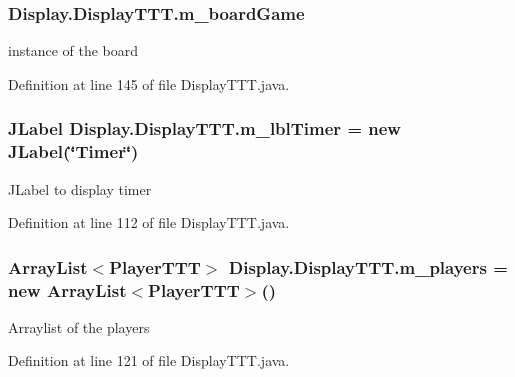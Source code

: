 \subsubsection[{m\+\_\+board\+Game}]{ Display.\+Display\+T\+T\+T.\+m\+\_\+board\+Game\hspace{0.3cm}{\ttfamily [private]}}\label{class_display_1_1_display_t_t_t_a3f540c3d30082e201fcb37c9623d6d27}
instance of the board 

Definition at line 145 of file Display\+T\+T\+T.\+java.

\hypertarget{class_display_1_1_display_t_t_t_a42c7a03ac93841369bd7e73460b59e11}{}
\subsubsection[{m\+\_\+lbl\+Timer}]{\setlength{\rightskip}{0pt plus 5cm}J\+Label Display.\+Display\+T\+T\+T.\+m\+\_\+lbl\+Timer = new J\+Label(\char`\"{}Timer\char`\"{})\hspace{0.3cm}{\ttfamily [private]}}\label{class_display_1_1_display_t_t_t_a42c7a03ac93841369bd7e73460b59e11}
J\+Label to display timer 

Definition at line 112 of file Display\+T\+T\+T.\+java.

\hypertarget{class_display_1_1_display_t_t_t_ad3a0687ab98eb4f191cd30a64ef60304}{}
\subsubsection[{m\+\_\+players}]{\setlength{\rightskip}{0pt plus 5cm}Array\+List$<${\bf Player\+T\+T\+T}$>$ Display.\+Display\+T\+T\+T.\+m\+\_\+players = new Array\+List$<${\bf Player\+T\+T\+T}$>$()\hspace{0.3cm}{\ttfamily [private]}}\label{class_display_1_1_display_t_t_t_ad3a0687ab98eb4f191cd30a64ef60304}
Arraylist of the players 

Definition at line 121 of file Display\+T\+T\+T.\+java.

\hypertarget{class_display_1_1_display_t_t_t_afbd113d4a9cd8573238108344561f62c}{}
